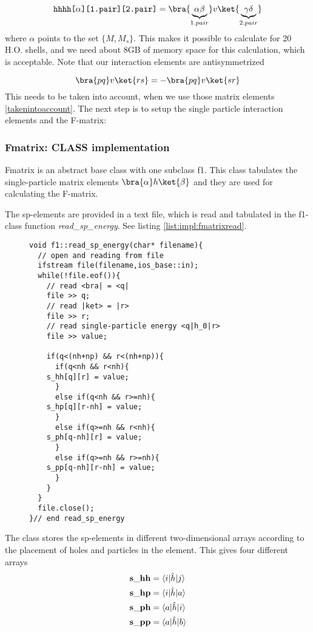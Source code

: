 \begin{equation}
  \texttt{hhhh[$\alpha$][1.pair][2.pair]} = \bra{\underbrace{\alpha \beta}_{1.pair}} v \ket{\underbrace{\gamma \delta}_{2.pair}}
  \label{takenintoaccount}
\end{equation}
%
where $\alpha$ points to the set $\{M,M_s\}$. This makes it possible to calculate for 20 H.O. shells, and we need about 8GB of memory space for this calculation, which is acceptable. Note that our interaction elements are antisymmetrized

\begin{equation*}
  \bra{pq}v\ket{rs} = -\bra{pq}v\ket{sr}
\end{equation*}
%
This needs to be taken into account, when we use those matrix elements \ref{takenintoaccount}.  
%
The next step is to setup the single particle interaction elements and the F-matrix:

\subsubsection{Fmatrix: CLASS implementation}

Fmatrix is an abstract base class with one subclass f1. This class tabulates the single-particle matrix elements $\bra{\alpha}h\ket{\beta}$ and they are used for calculating the F-matrix.

The sp-elements are provided in a text file, which is read and tabulated in the f1-class function \emph{read\_sp\_energy}. See listing \ref{list:impl:fmatrixread}. 
\begin{figure}[htb!]
\begin{lstlisting}[label={list:impl:fmatrixread},caption={Illustration of the implemented Fmatrix class function read\_sp\_energy. See the text for description.}]
void f1::read_sp_energy(char* filename){
  // open and reading from file
  ifstream file(filename,ios_base::in);
  while(!file.eof()){ 
    // read <bra| = <q|
    file >> q;
    // read |ket> = |r>
    file >> r; 
    // read single-particle energy <q|h_0|r>
    file >> value;
    
    if(q<(nh+np) && r<(nh+np)){
      if(q<nh && r<nh){
	s_hh[q][r] = value;
      }
      else if(q<nh && r>=nh){
	s_hp[q][r-nh] = value;
      }
      else if(q>=nh && r<nh){
	s_ph[q-nh][r] = value;
      }
      else if(q>=nh && r>=nh){
	s_pp[q-nh][r-nh] = value;
      }
    }
  }   
  file.close(); 
}// end read_sp_energy
\end{lstlisting}
\end{figure}
The class stores the sp-elements in different two-dimensional arrays according to the placement of holes and particles in the element. This gives four different arrays
\begin{align}  
{\bf s\_{hh}}&=\langle i|\hat{h}|j\rangle\nonumber\\
{\bf s\_{hp}}&=\langle i|\hat{h}|a\rangle\nonumber\\
{\bf s\_{ph}}&=\langle a|\hat{h}|i\rangle\nonumber\\
{\bf s\_{pp}}&=\langle a|\hat{h}|b\rangle
\end{align}

